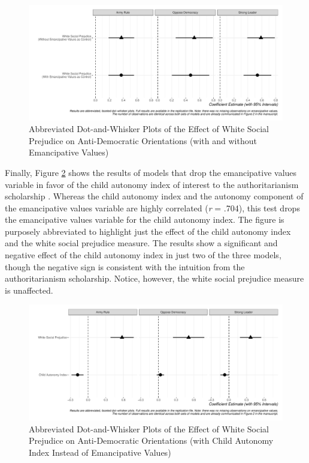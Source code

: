 \documentclass[11pt,]{article}
\begin{document}
\begin{figure}
\centering
\includegraphics{figs/noemanc.pdf}
\caption{\label{fig:noemanc}Abbreviated Dot-and-Whisker Plots of the
Effect of White Social Prejudice on Anti-Democratic Orientations (with
and without Emancipative Values)}
\end{figure}

Finally, Figure \ref{fig:cai} shows the results of models that drop the
emancipative values variable in favor of the child autonomy index of
interest to the authoritarianism scholarship
\citep[see][]{stenner2005tad}. Whereas the child autonomy index and the
autonomy component of the emancipative values variable are highly
correlated (\emph{r} = .704), this test drops the emancipative values
variable for the child autonomy index. The figure is purposely
abbreviated to highlight just the effect of the child autonomy index and
the white social prejudice measure. The results show a significant and
negative effect of the child autonomy index in just two of the three
models, though the negative sign is consistent with the intuition from
the authoritarianism scholarship. Notice, however, the white social
prejudice measure is unaffected.

\begin{figure}
\centering
\includegraphics{figs/cai.pdf}
\caption{\label{fig:cai}Abbreviated Dot-and-Whisker Plots of the Effect
of White Social Prejudice on Anti-Democratic Orientations (with Child
Autonomy Index Instead of Emancipative Values)}
\end{figure}





\newpage
\singlespacing 

\end{document}
